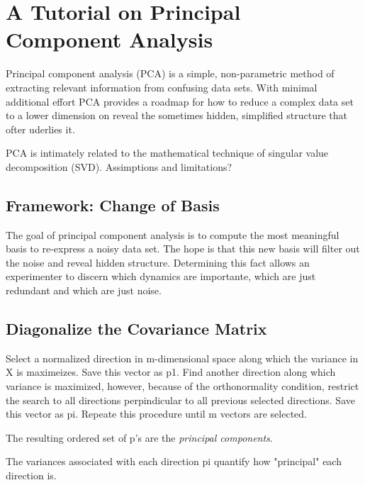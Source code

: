 \hypertarget{a-tutorial-on-principal-component-analysis}{%
\section{A Tutorial on Principal Component
Analysis}\label{a-tutorial-on-principal-component-analysis}}

Principal component analysis (PCA) is a simple, non-parametric method of
extracting relevant information from confusing data sets. With minimal
additional effort PCA provides a roadmap for how to reduce a complex
data set to a lower dimension on reveal the sometimes hidden, simplified
structure that ofter uderlies it.

PCA is intimately related to the mathematical technique of singular
value decomposition (SVD). Assimptions and limitations?

\hypertarget{framework-change-of-basis}{%
\subsection{Framework: Change of
Basis}\label{framework-change-of-basis}}

The goal of principal component analysis is to compute the most
meaningful basis to re-express a noisy data set. The hope is that this
new basis will filter out the noise and reveal hidden structure.
Determining this fact allows an experimenter to discern which dynamics
are importante, which are just redundant and which are just noise.

\hypertarget{diagonalize-the-covariance-matrix}{%
\subsection{Diagonalize the Covariance
Matrix}\label{diagonalize-the-covariance-matrix}}

Select a normalized direction in m-dimensional space along which the
variance in X is maximeizes. Save this vector as p1. Find another
direction along which variance is maximized, however, because of the
orthonormality condition, restrict the search to all directions
perpindicular to all previous selected directions. Save this vector as
pi. Repeate this procedure until m vectors are selected.

The resulting ordered set of p's are the \emph{principal components}.

The variances associated with each direction pi quantify how "principal"
each direction is.

